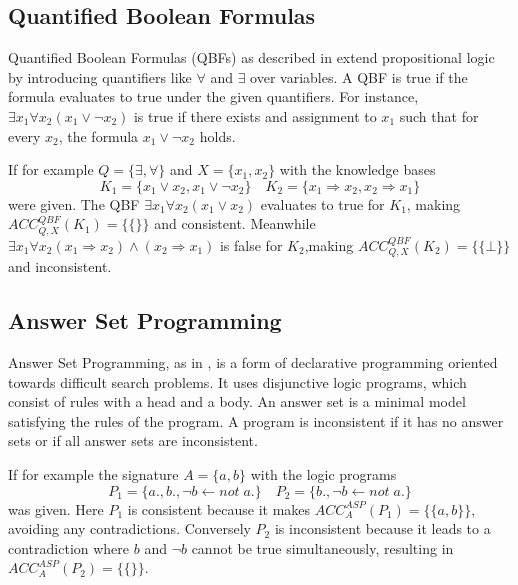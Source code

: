 \subsection{Quantified Boolean Formulas}
Quantified Boolean Formulas (QBFs) as described in \cite{gelfond_logic_2002} extend propositional logic by introducing quantifiers like \(\forall\) and \(\exists\) over variables.
A QBF is true if the formula evaluates to true under the given quantifiers.
For instance, \(\exists x_1 \forall x_2 (x_1 \lor \neg x_2)\) is true if there exists and assignment to \(x_1\) such that for every \(x_2\), the formula \(x_1 \lor \neg x_2\) holds.

If for example \(Q = \{\exists,\forall\}\) and \(X = \{x_1,x_2\}\) with the knowledge bases
\[K_1 = \{x_1 \lor  x_2, x_1 \lor \neg x_2\} \quad K_2 = \{x_1 \Rightarrow x_2, x_2 \Rightarrow x_1\}\]
were given.
The QBF \(\exists x_1 \forall x_2 (x_1 \lor x_2)\) evaluates to true for \(K_1\), making \(ACC^{QBF}_{Q,X}(K_1) = \{\{\}\}\) and consistent.
Meanwhile \(\exists x_1 \forall x_2 (x_1 \Rightarrow x_2) \land (x_2 \Rightarrow x_1)\) is false for \(K_2\),making \(ACC^{QBF}_{Q,X}(K_2) = \{\{\bot\}\}\) and inconsistent.

\subsection{Answer Set Programming}
Answer Set Programming, as in \cite{brewka_answer_2011}, is a form of declarative programming oriented towards difficult search problems.
It uses disjunctive logic programs, which consist of rules with a head and a body.
An answer set is a minimal model satisfying the rules of the program.
A program is inconsistent if it has no answer sets or if all answer sets are inconsistent.

If for example the signature \(A = \{a,b\}\) with the logic programs
\[P_1 = \{a., b., \neg b \leftarrow not \; a.\} \quad P_2 = \{b., \neg b \leftarrow not \; a.\}\]
was given.
Here \(P_1\) is consistent because it makes \(ACC^{ASP}_{A}(P_1) = \{\{a,b\}\}\), avoiding any contradictions.
Conversely \(P_2\) is inconsistent because it leads to a contradiction where \(b\) and \(\neg b\) cannot be true simultaneously, resulting in \(ACC^{ASP}_{A}(P_2) = \{\{\}\}\).


